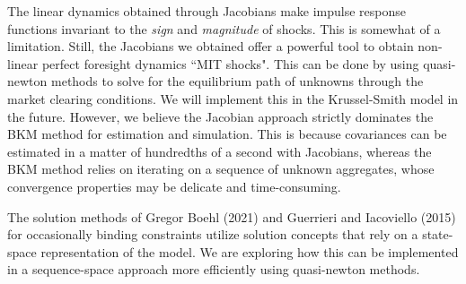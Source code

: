 \documentclass[10pt]{article} %
\begin{document}
The linear dynamics obtained through Jacobians make impulse response functions invariant to the \emph{sign} and \emph{magnitude} of shocks. This is somewhat of a limitation. Still, the Jacobians we obtained offer a powerful tool to obtain non-linear perfect foresight dynamics ``MIT shocks". This can be done by using quasi-newton methods to solve for the equilibrium path of unknowns through the market clearing conditions. We will implement this in the Krussel-Smith model in the future. However, we believe the Jacobian approach strictly dominates the BKM method for estimation and simulation. This is because covariances can be estimated in a matter of hundredths of a second with Jacobians, whereas the BKM method relies on iterating on a sequence of unknown aggregates, whose convergence properties may be delicate and time-consuming.

The solution methods of Gregor Boehl (2021) and Guerrieri and Iacoviello (2015) for occasionally binding constraints utilize solution concepts that rely on a state-space representation of the model. We are exploring how this can be implemented in a sequence-space approach more efficiently using quasi-newton methods. 
\end{document}
